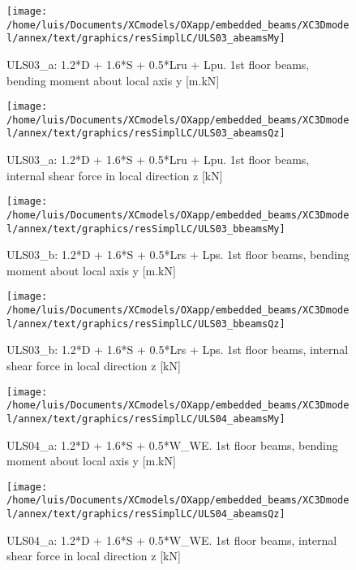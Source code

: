 \clearpage
\begin{figure}
\begin{center}
\texttt{[image: /home/luis/Documents/XCmodels/OXapp/embedded\_beams/XC3Dmodel/annex/text/graphics/resSimplLC/ULS03\_abeamsMy]}
\caption{ULS03_a: 1.2*D + 1.6*S + 0.5*Lru + Lpu. 1st floor beams, bending moment about local axis y [m.kN]}
\end{center}
\end{figure}
\begin{figure}
\begin{center}
\texttt{[image: /home/luis/Documents/XCmodels/OXapp/embedded\_beams/XC3Dmodel/annex/text/graphics/resSimplLC/ULS03\_abeamsQz]}
\caption{ULS03_a: 1.2*D + 1.6*S + 0.5*Lru + Lpu. 1st floor beams, internal shear force in local direction z [kN]}
\end{center}
\end{figure}
\clearpage
\begin{figure}
\begin{center}
\texttt{[image: /home/luis/Documents/XCmodels/OXapp/embedded\_beams/XC3Dmodel/annex/text/graphics/resSimplLC/ULS03\_bbeamsMy]}
\caption{ULS03_b: 1.2*D + 1.6*S + 0.5*Lrs + Lps. 1st floor beams, bending moment about local axis y [m.kN]}
\end{center}
\end{figure}
\begin{figure}
\begin{center}
\texttt{[image: /home/luis/Documents/XCmodels/OXapp/embedded\_beams/XC3Dmodel/annex/text/graphics/resSimplLC/ULS03\_bbeamsQz]}
\caption{ULS03_b: 1.2*D + 1.6*S + 0.5*Lrs + Lps. 1st floor beams, internal shear force in local direction z [kN]}
\end{center}
\end{figure}
\clearpage
\begin{figure}
\begin{center}
\texttt{[image: /home/luis/Documents/XCmodels/OXapp/embedded\_beams/XC3Dmodel/annex/text/graphics/resSimplLC/ULS04\_abeamsMy]}
\caption{ULS04_a: 1.2*D + 1.6*S + 0.5*W_WE. 1st floor beams, bending moment about local axis y [m.kN]}
\end{center}
\end{figure}
\begin{figure}
\begin{center}
\texttt{[image: /home/luis/Documents/XCmodels/OXapp/embedded\_beams/XC3Dmodel/annex/text/graphics/resSimplLC/ULS04\_abeamsQz]}
\caption{ULS04_a: 1.2*D + 1.6*S + 0.5*W_WE. 1st floor beams, internal shear force in local direction z [kN]}
\end{center}
\end{figure}
